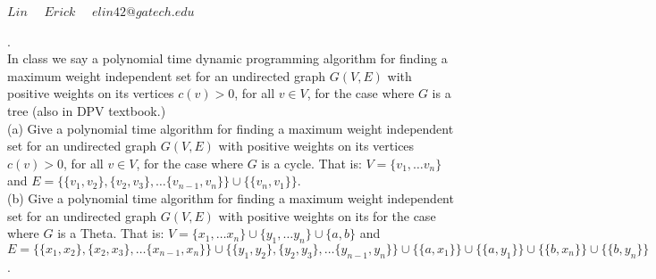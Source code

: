 \documentclass[a4paper,11pt]{article}
\begin{document}
\title{
}

\date{}


\newcommand{\DEF}[1]{{\em #1\/}}

\newcommand\chic{\chi_c}
\newcommand\C{\hbox{${\cal C}$}}
\newcommand{\RR}{\mbox{$\mathbb R$}}
\newcommand{\NN}{\mbox{$\mathbb N$}}
\newcommand{\ZZ}{\mbox{$\mathbb Z$}}
\newcommand{\eopf}{\raisebox{0.8ex}{\framebox{}}}
\newcommand{\dist}{\hbox{\rm d}}
\renewcommand\a{\alpha}
\renewcommand\b{\beta}
\renewcommand\c{\gamma}
\renewcommand\d{\delta}
\newcommand\D{\Delta}
\newcommand{\directedchi}{\mbox{$\vec{\chi}$}}
\newcommand{\directedE}{\mbox{$\vec{E}$}}
\newcommand{\directedG}{\mbox{$\vec{G}$}}
\newcommand{\directedK}{\mbox{$\vec{K}$}}

\newenvironment{proof}%
{\noindent{\bf Proof.}\ }%
{\hfill\eopf\par\bigskip}%



 $Lin \quad$
 $Erick \quad$
          $elin42@gatech.edu$\\

\bigskip


.  \\
In class we say a polynomial time dynamic programming algorithm for finding a maximum weight independent set
for an undirected graph $G(V,E)$ with positive weights on its vertices $c(v) > 0$, for all $v\in V$, for the case where 
$G$ is a tree (also in DPV textbook.) \\
(a) Give a polynomial time algorithm for finding a maximum weight independent set
for an undirected graph $G(V,E)$ with positive weights on its vertices $c(v) > 0$, for all $v\in V$, for the case where 
$G$ is a cycle. That is: $V= \{ v_1 , \ldots v_n \}$ and $E = \{  \{ v_1 , v_2  \} , \{  v_2 , v_3 \} , \ldots \{  v_{n-1} , v_n\}  \}\cup \{ \{ v_n , v_1\} \}$. \\
(b) Give a polynomial time algorithm for finding a maximum weight independent set
for an undirected graph $G(V,E)$ with positive weights on its  for the case where 
$G$ is a Theta. That is: 
$V= \{ x_1 , \ldots x_n \} \cup  \{ y_1 , \ldots y_n \} \cup \{ a , b\}$ 
and $E = \{  \{ x_1 , x_2  \} , \{  x_2 , x_3 \} , \ldots \{  x_{n-1} , x_n\}     \}
\cup \{  \{ y_1 , y_2  \} , \{  y_2 , y_3 \} , \ldots \{  y_{n-1} , y_n\}     \} 
\cup \{ \{ a, x_1 \} \}  \cup \{ \{ a, y_1 \} \}  \cup \{ \{ b, x_n\} \}  \cup \{ \{ b , y_n\} \} 
$. \\
\end{document}
